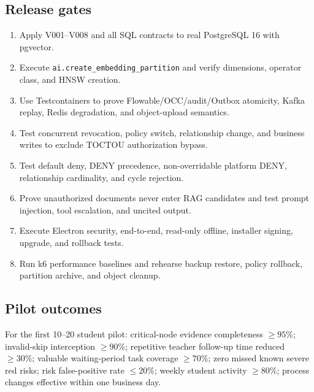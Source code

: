 \documentclass[journal,a4paper,onecolumn]{IEEEtran}
\begin{document}
\subsection{Release gates}
\begin{enumerate}[leftmargin=*]
\item Apply V001--V008 and all SQL contracts to real PostgreSQL 16 with pgvector.
\item Execute \texttt{ai.create\_embedding\_partition} and verify dimensions, operator class, and HNSW creation.
\item Use Testcontainers to prove Flowable/OCC/audit/Outbox atomicity, Kafka replay, Redis degradation, and object-upload semantics.
\item Test concurrent revocation, policy switch, relationship change, and business writes to exclude TOCTOU authorization bypass.
\item Test default deny, DENY precedence, non-overridable platform DENY, relationship cardinality, and cycle rejection.
\item Prove unauthorized documents never enter RAG candidates and test prompt injection, tool escalation, and uncited output.
\item Execute Electron security, end-to-end, read-only offline, installer signing, upgrade, and rollback tests.
\item Run k6 performance baselines and rehearse backup restore, policy rollback, partition archive, and object cleanup.
\end{enumerate}

\subsection{Pilot outcomes}
For the first 10--20 student pilot: critical-node evidence completeness $\geq95\%$; invalid-skip interception $\geq90\%$; repetitive teacher follow-up time reduced $\geq30\%$; valuable waiting-period task coverage $\geq70\%$; zero missed known severe red risks; risk false-positive rate $\leq20\%$; weekly student activity $\geq80\%$; process changes effective within one business day.
\end{document}
